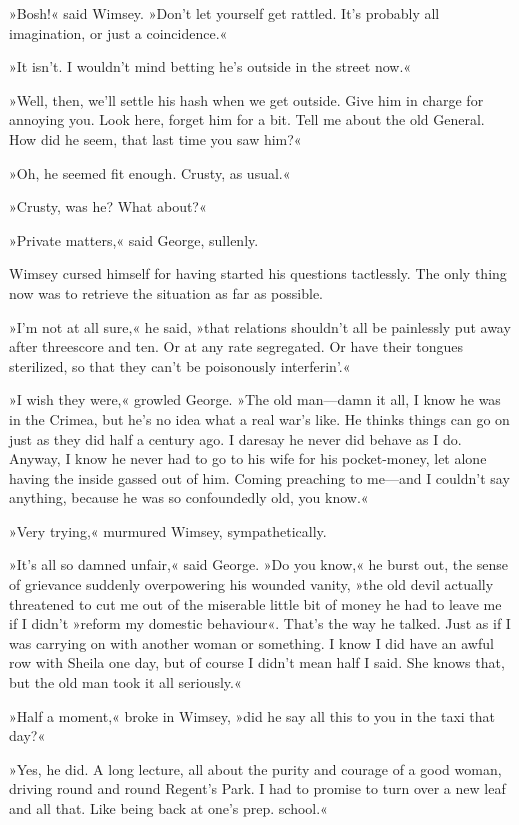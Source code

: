»Bosh!« said Wimsey. »Don't let yourself get rattled. It's probably all imagination, or just a coincidence.«

»It isn't. I wouldn't mind betting he's outside in the street now.«

»Well, then, we'll settle his hash when we get outside. Give him in charge for annoying you. Look here, forget him for a bit. Tell me about the old General. How did he seem, that last time you saw him?«

»Oh, he seemed fit enough. Crusty, as usual.«

»Crusty, was he? What about?«

»Private matters,« said George, sullenly.

Wimsey cursed himself for having started his questions tactlessly. The only thing now was to retrieve the situation as far as possible.

»I'm not at all sure,« he said, »that relations shouldn't all be painlessly put away after threescore and ten. Or at any rate segregated. Or have their tongues sterilized, so that they can't be poisonously interferin'.«

»I wish they were,« growled George. »The old man\allowbreak---\allowbreak damn it all, I know he was in the Crimea, but he's no idea what a real war's like. He thinks things can go on just as they did half a century ago. I daresay he never did behave as I do. Anyway, I know he never had to go to his wife for his pocket-money, let alone having the inside gassed out of him. Coming preaching to me\allowbreak---\allowbreak and I couldn't say anything, because he was so confoundedly old, you know.«

»Very trying,« murmured Wimsey, sympathetically.

»It's all so damned unfair,« said George. »Do you know,« he burst out, the sense of grievance suddenly overpowering his wounded vanity, »the old devil actually threatened to cut me out of the miserable little bit of money he had to leave me if I didn't »reform my domestic behaviour«. That's the way he talked. Just as if I was carrying on with another woman or something. I know I did have an awful row with Sheila one day, but of course I didn't mean half I said. She knows that, but the old man took it all seriously.«

»Half a moment,« broke in Wimsey, »did he say all this to you in the taxi that day?«

»Yes, he did. A long lecture, all about the purity and courage of a good woman, driving round and round Regent's Park. I had to promise to turn over a new leaf and all that. Like being back at one's prep. school.«

